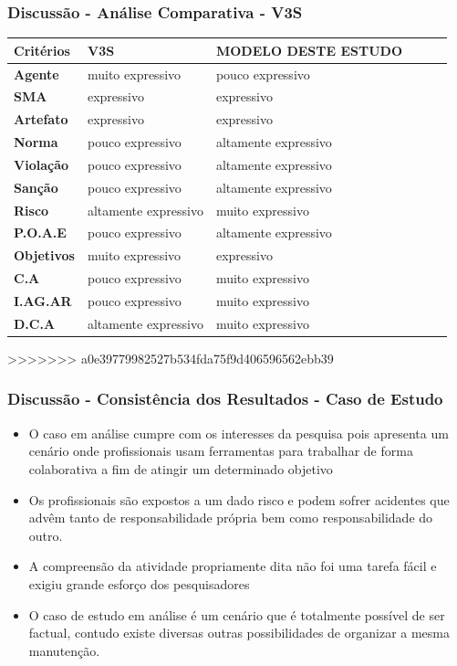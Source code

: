 \documentclass{beamer}
\begin{document}
\begin{frame}
	\frametitle{Discussão - Análise Comparativa - V3S}
	\begin{table}[H]
	    \begin{tabular}{|l|l|l|l|l|l|}
        \textbf{Critérios} 	&	 \textbf{V3S}         	&	 \textbf{MODELO DESTE ESTUDO} \\ \hline
        \textbf{Agente}    	&	 muito expressivo     	&	 pouco expressivo             \\ \hline
        \textbf{SMA}       	&	 expressivo           	&	 expressivo                   \\ \hline
        \textbf{Artefato}  	&	 expressivo           	&	 expressivo                   \\ \hline
        \textbf{Norma}     	&	 pouco expressivo     	&	 altamente expressivo         \\ \hline
        \textbf{Violação}  	&	 pouco expressivo     	&	 altamente expressivo         \\ \hline
        \textbf{Sanção}    	&	 pouco expressivo     	&	 altamente expressivo         \\ \hline
        \textbf{Risco}     	&	 altamente expressivo 	&	 muito expressivo             \\ \hline
        \textbf{P.O.A.E}   	&	 pouco expressivo     	&	 altamente expressivo         \\ \hline
        \textbf{Objetivos} 	&	 muito expressivo       &	 expressivo             	  \\ \hline
        \textbf{C.A}       	&	 pouco expressivo     	&	 muito expressivo             \\ \hline
        \textbf{I.AG.AR}   	&	 pouco expressivo     	&	 muito expressivo             \\ \hline
        \textbf{D.C.A}     	&	 altamente expressivo 	&	 muito expressivo             \\ \hline
	    \end{tabular}
	\end{table}	
>>>>>>> a0e39779982527b534fda75f9d406596562ebb39
\end{frame}

\begin{frame}
	\frametitle{Discussão - Consistência dos Resultados - Caso de Estudo}
	\begin{itemize}
		\item  O caso em análise cumpre com os interesses da pesquisa pois apresenta um cenário onde profissionais usam ferramentas para trabalhar de forma colaborativa a fim de atingir um determinado objetivo
		\item Os profissionais são expostos a um dado risco e podem sofrer acidentes que advêm tanto de responsabilidade própria bem como responsabilidade do outro.
		\item A compreensão da atividade propriamente dita não foi uma tarefa fácil e exigiu grande esforço dos pesquisadores
		\item O caso de estudo em análise é um cenário que é totalmente possível de ser factual, contudo existe diversas outras possibilidades de organizar a mesma manutenção.
	\end{itemize}
\end{frame}
\end{document}
